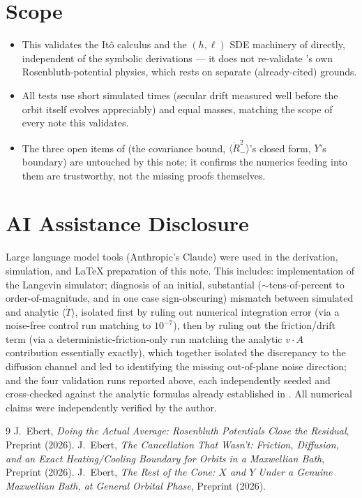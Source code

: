 \documentclass[12pt]{amsart}
\theoremstyle{plain}
\theoremstyle{remark}
\begin{document}
\section{Scope}

\begin{itemize}
\item[--] This validates the It\^o calculus and the $(h,\ell)$ SDE machinery of \cite{Ebert2026Cancellation,Ebert2026Rest} directly, independent of the symbolic derivations --- it does not re-validate \cite{Ebert2026Rosenbluth}'s own Rosenbluth-potential physics, which rests on separate (already-cited) grounds.
\item[--] All tests use short simulated times (secular drift measured well before the orbit itself evolves appreciably) and equal masses, matching the scope of every note this validates.
\item[--] The three open items of \cite{Ebert2026Rest} (the covariance bound, $\langle\dot R_-^2\rangle$'s closed form, $Y$'s boundary) are untouched by this note; it confirms the numerics feeding into them are trustworthy, not the missing proofs themselves.
\end{itemize}

\section*{AI Assistance Disclosure}

Large language model tools (Anthropic's Claude) were used in the derivation, simulation, and \LaTeX{} preparation of this note. This includes: implementation of the Langevin simulator; diagnosis of an initial, substantial ($\sim$tens-of-percent to order-of-magnitude, and in one case sign-obscuring) mismatch between simulated and analytic $\langle\dot T\rangle$, isolated first by ruling out numerical integration error (via a noise-free control run matching to $10^{-7}$), then by ruling out the friction/drift term (via a deterministic-friction-only run matching the analytic $v\cdot A$ contribution essentially exactly), which together isolated the discrepancy to the diffusion channel and led to identifying the missing out-of-plane noise direction; and the four validation runs reported above, each independently seeded and cross-checked against the analytic formulas already established in \cite{Ebert2026Cancellation,Ebert2026Rest}. All numerical claims were independently verified by the author.

\begin{thebibliography}{9}
 J.~Ebert, \emph{Doing the Actual Average: Rosenbluth Potentials Close the Residual}, Preprint (2026).
 J.~Ebert, \emph{The Cancellation That Wasn't: Friction, Diffusion, and an Exact Heating/Cooling Boundary for Orbits in a Maxwellian Bath}, Preprint (2026).
 J.~Ebert, \emph{The Rest of the Cone: $X$ and $Y$ Under a Genuine Maxwellian Bath, at General Orbital Phase}, Preprint (2026).
\end{thebibliography}
\end{document}
